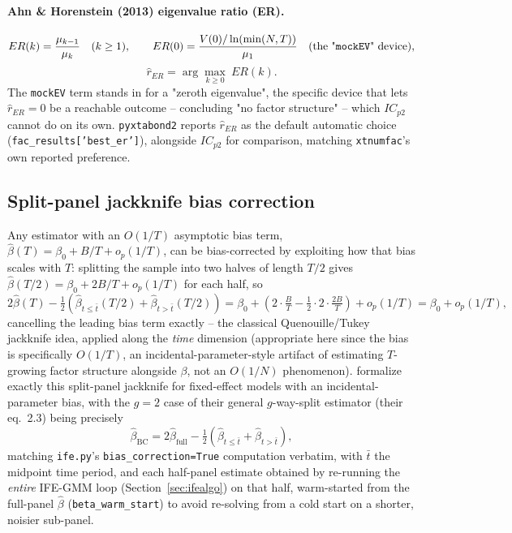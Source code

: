 \documentclass[11pt,a4paper]{article}
\newcommand{\pkg}{\texttt{pyxtabond2}}
\newcommand{\bigO}{O}
\begin{document}
\paragraph{Ahn \& Horenstein (2013) eigenvalue ratio (ER).}
\[
  ER(k) = \frac{\mu_{k-1}}{\mu_k}\quad(k\ge1),
  \qquad
  ER(0) = \frac{V(0)/\ln(\min(N,T))}{\mu_1}\quad(\text{the "\texttt{mockEV}" device}),
\]
\[
  \hat r_{ER}=\arg\max_{k\ge0}\ ER(k).
\]
The \texttt{mockEV} term stands in for a "zeroth eigenvalue", the specific
device that lets $\hat r_{ER}=0$ be a reachable outcome -- concluding "no
factor structure" -- which $IC_{p2}$ cannot do on its own. \pkg{} reports
$\hat r_{ER}$ as the default automatic choice (\texttt{fac\_results['best\_er']}),
alongside $IC_{p2}$ for comparison, matching \texttt{xtnumfac}'s own
reported preference.

\subsection{Split-panel jackknife bias correction}
\label{sec:jackknife}

Any estimator with an $\bigO(1/T)$ asymptotic bias term, $\hat\beta(T) =
\beta_0 + B/T + o_p(1/T)$, can be bias-corrected by exploiting how that bias
scales with $T$: splitting the sample into two halves of length $T/2$ gives
$\hat\beta(T/2)=\beta_0+2B/T+o_p(1/T)$ for each half, so
\[
  2\hat\beta(T) - \tfrac12\left(\hat\beta_{t\le\bar t}(T/2)+\hat\beta_{t>\bar t}(T/2)\right)
    = \beta_0 + \left(2\cdot\tfrac{B}{T}-\tfrac12\cdot2\cdot\tfrac{2B}{T}\right) + o_p(1/T)
    = \beta_0 + o_p(1/T),
\]
cancelling the leading bias term exactly -- the classical
Quenouille/Tukey jackknife idea, applied along the \emph{time} dimension
(appropriate here since the bias is specifically $\bigO(1/T)$, an
incidental-parameter-style artifact of estimating $T$-growing factor
structure alongside $\beta$, not an $\bigO(1/N)$ phenomenon). \citet{DhaeneJochmans2015}
formalize exactly this split-panel jackknife for fixed-effect models with an
incidental-parameter bias, with the $g=2$ case of their general
$g$-way-split estimator (their eq.\ 2.3) being precisely
\begin{equation}
  \hat\beta_{\mathrm{BC}} = 2\hat\beta_{\mathrm{full}}
    - \tfrac12\left(\hat\beta_{t\le\bar t}+\hat\beta_{t>\bar t}\right), \label{eq:jackknife}
\end{equation}
matching \texttt{ife.py}'s \texttt{bias\_correction=True} computation
verbatim, with $\bar t$ the midpoint time period, and each half-panel
estimate obtained by re-running the \emph{entire} IFE-GMM loop
(Section~\ref{sec:ifealgo}) on that half, warm-started from the full-panel
$\hat\beta$ (\texttt{beta\_warm\_start}) to avoid re-solving from a cold
start on a shorter, noisier sub-panel.
\end{document}
